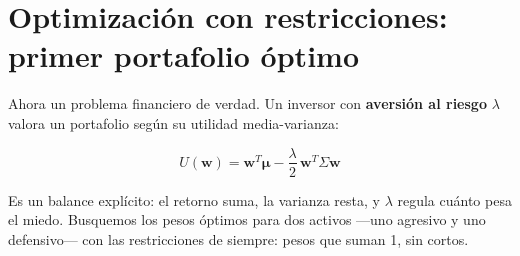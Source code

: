 \documentclass[
  spanish,
  letterpaper,
  DIV=11,
  numbers=noendperiod]{scrreprt}
\begin{document}
\section{Optimización con restricciones: primer portafolio
óptimo}\label{optimizaciuxf3n-con-restricciones-primer-portafolio-uxf3ptimo}

Ahora un problema financiero de verdad. Un inversor con \textbf{aversión
al riesgo} \(\lambda\) valora un portafolio según su utilidad
media-varianza:

\[U(\mathbf{w}) = \mathbf{w}^T\boldsymbol{\mu} - \frac{\lambda}{2}\, \mathbf{w}^T \Sigma \mathbf{w}\]

Es un balance explícito: el retorno suma, la varianza resta, y
\(\lambda\) regula cuánto pesa el miedo. Busquemos los pesos óptimos
para dos activos ---uno agresivo y uno defensivo--- con las
restricciones de siempre: pesos que suman 1, sin cortos.
\end{document}
